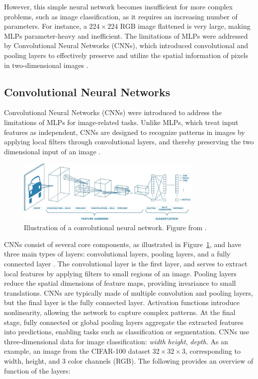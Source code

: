 However, this simple neural network becomes insufficient for more complex problems, such as image classification, as it requires an increasing number of parameters. For instance, a $224\times 224$ RGB image flattened is very large, making MLPs parameter-heavy and inefficient. The limitations of MLPs were addressed by Convolutional Neural Networks (CNNs), which introduced convolutional and pooling layers to effectively preserve and utilize the spatial information of pixels in two-dimensional images \cite{zhang2023dive}.



\subsection{Convolutional Neural Networks}
\label{sec:CNNs}
Convolutional Neural Networks (CNNs) \cite{lecun1995} were introduced to address the limitations of MLPs for image-related tasks. Unlike MLPs, which treat input features as independent, CNNs are designed to recognize patterns in images by applying local filters through convolutional layers, and thereby preserving the two dimensional input of an image \cite{lecun1998,NIPS2012_c399862d,zhang2023dive}. 

\begin{figure}[ht]
    \centering
    \includegraphics[width=0.8\textwidth]{Images/CNN_illustration.jpg} 
    \caption{Illustration of a convolutional neural network. Figure from \cite{mathworks_cnn}. }
    \label{fig:cnn_illustration}
\end{figure}

CNNs consist of several core components, as illustrated in Figure~\ref{fig:cnn_illustration}, and have three main types of layers: convolutional layers, pooling layers, and a fully connected layer \cite{cs231n}. The convolutional layer is the first layer, and serves to extract local features by applying filters to small regions of an image. Pooling layers reduce the spatial dimensions of feature maps, providing invariance to small translations. CNNs are typically made of multiple convolution and pooling layers, but the final layer is the fully connected layer. Activation functions introduce nonlinearity, allowing the network to capture complex patterns. At the final stage, fully connected or global pooling layers aggregate the extracted features into predictions, enabling tasks such as classification or segmentation. CNNs use three-dimensional data for image classification: \emph{width} \emph{height}, \emph{depth}. As an example, an image from the CIFAR-100 dataset $32\times 32\times 3$, corresponding to width, height, and 3 color channels (RGB). The following provides an overview of function of the layers:


